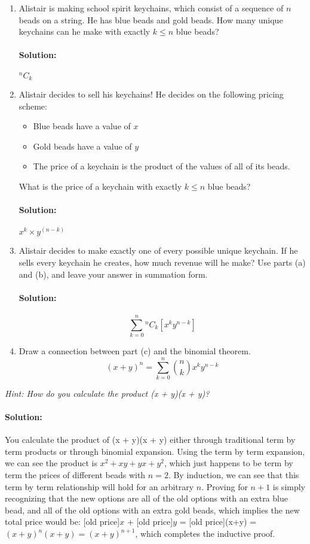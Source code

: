 \documentclass[11pt, notitlepage]{article}
\newcommand*{\Comb}[2]{{}^{#1}C_{#2}}%
\newenvironment{solution}{\paragraph{Solution:}}{\hfill}
\begin{document}
\begin{enumerate}[label=\alph*.)]
    \item
    Alistair is making school spirit keychains, which consist of a sequence of $n$ beads on a string. He has blue beads and gold beads. How many unique keychains can he make with exactly $k \leq n$ blue beads?
	\begin{solution}
		$\Comb{n}{k}$
	\end{solution}
    \item 
    Alistair decides to sell his keychains! He decides on the following pricing scheme:
    \begin{itemize}
    	\item Blue beads have a value of $x$
    	\item Gold beads have a value of $y$
    	\item The price of a keychain is the product of the values of all of its beads.
    \end{itemize}
    What is the price of a keychain with exactly $k \leq n$ blue beads?
	\begin{solution}
		$x^k \times y^{(n-k)}$
	\end{solution}
    \item
    Alistair decides to make exactly one of every possible unique keychain. If he sells every keychain he creates, how much revenue will he make? Use parts (a) and (b), and leave your answer in summation form.
	\begin{solution}
		\[\sum_{k=0}^{n}{\Comb{n}{k}[x^k y^{n-k}]}\]
	\end{solution}
    \item Draw a connection between part (c) and the binomial theorem.
    \[(x+y)^n = \sum_{k=0}^n {n \choose k} x^ky^{n-k}\]
\end{enumerate}

    \textit{Hint: How do you calculate the product (x + y)(x + y)?}
	\begin{solution}
		You calculate the product of (x + y)(x + y) either through traditional term by term products or through binomial expansion. Using the term by term expansion, we can see the product is $x^2 + xy + yx + y^2$, which just happens to be term by term the prices of different beads with $n=2$. By induction, we can see that this term by term relationship will hold for an arbitrary $n$. Proving for $n+1$ is simply recognizing that the new options are all of the old options with an extra blue bead, and all of the old options with an extra gold beads, which implies the new total price would be: [old price]$x$ + [old price]$y$ = [old price](x+y) = $(x+y)^n (x+y) = (x+y)^{n+1}$, which completes the inductive proof.
		\end{solution}
\end{document}
